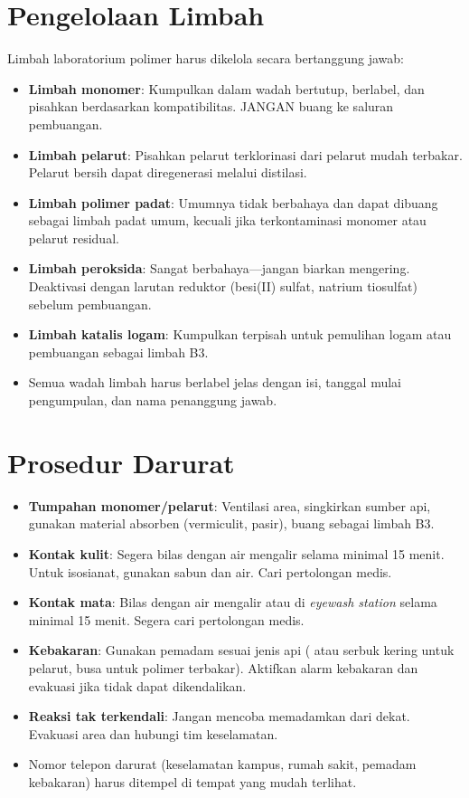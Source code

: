 \documentclass[12pt,a4paper,openany]{book}
\begin{document}
\section*{Pengelolaan Limbah}

Limbah laboratorium polimer harus dikelola secara bertanggung jawab:

\begin{itemize}
\item \textbf{Limbah monomer}: Kumpulkan dalam wadah bertutup, berlabel, dan pisahkan berdasarkan kompatibilitas. JANGAN buang ke saluran pembuangan.
\item \textbf{Limbah pelarut}: Pisahkan pelarut terklorinasi dari pelarut mudah terbakar. Pelarut bersih dapat diregenerasi melalui distilasi.
\item \textbf{Limbah polimer padat}: Umumnya tidak berbahaya dan dapat dibuang sebagai limbah padat umum, kecuali jika terkontaminasi monomer atau pelarut residual.
\item \textbf{Limbah peroksida}: Sangat berbahaya---jangan biarkan mengering. Deaktivasi dengan larutan reduktor (besi(II) sulfat, natrium tiosulfat) sebelum pembuangan.
\item \textbf{Limbah katalis logam}: Kumpulkan terpisah untuk pemulihan logam atau pembuangan sebagai limbah B3.
\item Semua wadah limbah harus berlabel jelas dengan isi, tanggal mulai pengumpulan, dan nama penanggung jawab.
\end{itemize}

\section*{Prosedur Darurat}

\begin{itemize}
\item \textbf{Tumpahan monomer/pelarut}: Ventilasi area, singkirkan sumber api, gunakan material absorben (vermiculit, pasir), buang sebagai limbah B3.
\item \textbf{Kontak kulit}: Segera bilas dengan air mengalir selama minimal 15 menit. Untuk isosianat, gunakan sabun dan air. Cari pertolongan medis.
\item \textbf{Kontak mata}: Bilas dengan air mengalir atau di \textit{eyewash station} selama minimal 15 menit. Segera cari pertolongan medis.
\item \textbf{Kebakaran}: Gunakan pemadam sesuai jenis api ( atau serbuk kering untuk pelarut, busa untuk polimer terbakar). Aktifkan alarm kebakaran dan evakuasi jika tidak dapat dikendalikan.
\item \textbf{Reaksi tak terkendali}: Jangan mencoba memadamkan dari dekat. Evakuasi area dan hubungi tim keselamatan.
\item Nomor telepon darurat (keselamatan kampus, rumah sakit, pemadam kebakaran) harus ditempel di tempat yang mudah terlihat.
\end{itemize}
\end{document}
